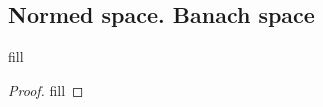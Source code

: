 \subsection{Normed space. Banach space}

\begin{exercise}{1}
fill
\end{exercise}
\begin{proof}
fill
\end{proof}